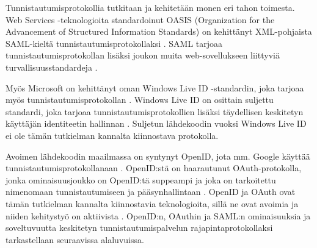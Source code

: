 Tunnistautumisprotokollia tutkitaan ja kehitetään monen eri tahon toimesta. Web Services -teknologioita standardoinut OASIS (Organization for the Advancement of Structured Information Standards) on kehittänyt XML-pohjaista SAML-kieltä tunnistautumisprotokollaksi \cite{saml_spec}. SAML tarjoaa tunnistautumisprotokollan lisäksi joukon muita web-sovellukseen liittyviä turvallisuusstandardeja \cite{next_saml}.

Myös Microsoft on kehittänyt oman Windows Live ID -standardin, joka tarjoaa myös tunnistautumisprotokollan \cite{open_identity}. Windows Live ID on osittain suljettu standardi, joka tarjoaa tunnistautumisprotokollien lisäksi täydellisen keskitetyn käyttäjän identiteetin hallinnan \cite{open_identity}. Suljetun lähdekoodin vuoksi Windows Live ID ei ole tämän tutkielman kannalta kiinnostava protokolla.

Avoimen lähdekoodin maailmassa on syntynyt OpenID, jota mm. Google käyttää tunnistautumisprotokollanaan \cite{open_identity}. OpenID:stä on haarautunut OAuth-protokolla, jonka ominaisuusjoukko on OpenID:tä suppeampi ja joka on tarkoitettu nimenomaan tunnistautumiseen ja pääsynhallintaan \cite{formal_oauth}. OpenID ja OAuth ovat tämän tutkielman kannalta kiinnostavia teknologioita, sillä ne ovat avoimia ja niiden kehitystyö on aktiivista \cite{facebook}. OpenID:n, OAuthin ja SAML:n ominaisuuksia ja soveltuvuutta keskitetyn tunnistautumispalvelun rajapintaprotokollaksi tarkastellaan seuraavissa alaluvuissa.